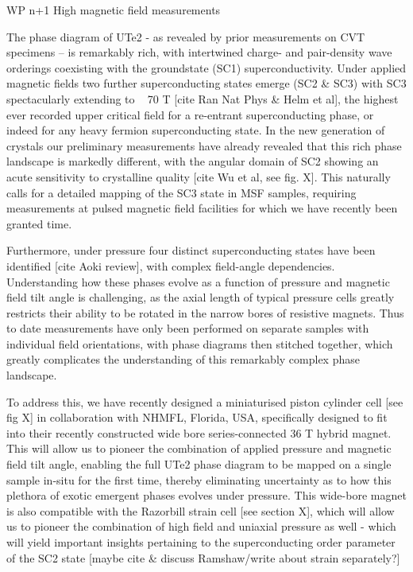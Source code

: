  

 

WP n+1 High magnetic field measurements 

 

The phase diagram of UTe2 - as revealed by prior measurements on CVT specimens – is remarkably rich, with intertwined charge- and pair-density wave orderings coexisting with the groundstate (SC1) superconductivity. Under applied magnetic fields two further superconducting states emerge (SC2 \& SC3) with SC3 spectacularly extending to ~ 70 T [cite Ran Nat Phys \& Helm et al], the highest ever recorded upper critical field for a re-entrant superconducting phase, or indeed for any heavy fermion superconducting state. In the new generation of crystals our preliminary measurements have already revealed that this rich phase landscape is markedly different, with the angular domain of SC2 showing an acute sensitivity to crystalline quality [cite Wu et al, see fig. X]. This naturally calls for a detailed mapping of the SC3 state in MSF samples, requiring measurements at pulsed magnetic field facilities for which we have recently been granted time. 

 

Furthermore, under pressure four distinct superconducting states have been identified [cite Aoki review], with complex field-angle dependencies. Understanding how these phases evolve as a function of pressure and magnetic field tilt angle is challenging, as the axial length of typical pressure cells greatly restricts their ability to be rotated in the narrow bores of resistive magnets. Thus to date measurements have only been performed on separate samples with individual field orientations, with phase diagrams then stitched together, which greatly complicates the understanding of this remarkably complex phase landscape. 

 

To address this, we have recently designed a miniaturised piston cylinder cell [see fig X] in collaboration with NHMFL, Florida, USA, specifically designed to fit into their recently constructed wide bore series-connected 36 T hybrid magnet. This will allow us to pioneer the combination of applied pressure and magnetic field tilt angle, enabling the full UTe2 phase diagram to be mapped on a single sample in-situ for the first time, thereby eliminating uncertainty as to how this plethora of exotic emergent phases evolves under pressure. This wide-bore magnet is also compatible with the Razorbill strain cell [see section X], which will allow us to pioneer the combination of high field and uniaxial pressure as well - which will yield important insights pertaining to the superconducting order parameter of the SC2 state [maybe cite \& discuss Ramshaw/write about strain separately?] 

